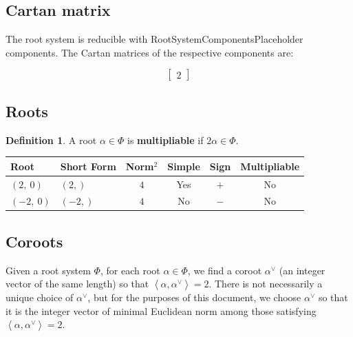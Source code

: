 \documentclass[11pt]{article}
\newcommand{\noi}{\noindent}
\newcommand{\tbf}{\textbf}
\newcommand{\la}{\left\langle}
\newcommand{\ra}{\right\rangle}
\theoremstyle{definition}
\newtheorem{definition}{Definition}[section]
\newif\ifrootsystemirreducible
\begin{document}
\begin{center}
\end{center}

\subsection{Cartan matrix}

\ifrootsystemirreducible
The root system is irreducible and has Cartan matrix:
\else
The root system is reducible with RootSystemComponentsPlaceholder components. The Cartan matrices of the respective components are:
\fi

\[
\left[\begin{matrix}2\end{matrix}\right]
\]

\subsection{Roots}

\begin{definition}
A root $\alpha \in \Phi$ is \tbf{multipliable} if $2\alpha \in \Phi$.
\end{definition}

\noi \begin{tabular}{|l|l|c|c|c|c|}
    \hline
    \textbf{Root} & \textbf{Short Form} & \textbf{Norm$^2$} & \textbf{Simple} & \textbf{Sign} & \textbf{Multipliable} \\
    \hline
    $\left( 2, \  0\right)$ & $\left( 2,\right)$ & $4$ & Yes & $+$ & No \\
    \hline
    $\left( -2, \  0\right)$ & $\left( -2,\right)$ & $4$ & No & $-$ & No \\
    \hline
\end{tabular}


\subsection{Coroots}

Given a root system $\Phi$, for each root $\alpha \in \Phi$, we find a coroot $\alpha^\vee$ (an integer vector of the same length) so that $\la \alpha, \alpha^\vee \ra = 2$. There is not necessarily a unique choice of $\alpha^\vee$, but for the purposes of this document, we choose $\alpha^\vee$ so that it is the integer vector of minimal Euclidean norm among those satisfying $\la \alpha, \alpha^\vee \ra = 2$.
\end{document}
